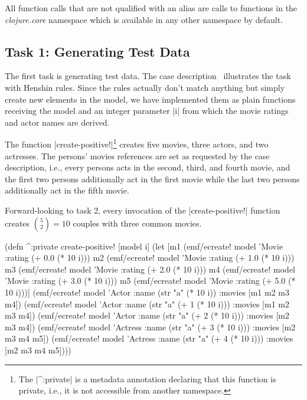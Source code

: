 \documentclass[a4paper]{article}
\newcommand{\code}{\clojureinline}
\begin{document}
All function calls that are not qualified with an alias are calls to functions
in the \emph{clojure.core} namespace which is available in any other namespace
by default.

\subsection{Task 1: Generating Test Data}
\label{sec:task-1:generating-test-data}

The first task is generating test data.  The case
description~\cite{movies-case-desc} illustrates the task with Henshin rules.
Since the rules actually don't match anything but simply create new elements in
the model, we have implemented them as plain functions receiving the model and
an integer parameter \code|i| from which the movie ratings and actor names are
derived.

The function \code|create-positive!|\footnote{The \code|^:private| is a
  metadata annotation declaring that this function is private, i.e., it is not
  accessible from another namespace.} creates five movies, three actors, and
two actresses.  The persons' \textsf{movies} references are set as requested by
the case description, i.e., every persons acts in the second, third, and fourth
movie, and the first two persons additionally act in the first movie while the
last two persons additionally act in the fifth movie.

Forward-looking to task 2, every invocation of the \code|create-positive!|
function creates \({5 \choose 2} = 10\) couples with three common movies.

\begin{clojurecode}
(defn ^:private create-positive! [model i]
  (let [m1 (emf/ecreate! model 'Movie :rating (+ 0.0 (* 10 i)))
        m2 (emf/ecreate! model 'Movie :rating (+ 1.0 (* 10 i)))
        m3 (emf/ecreate! model 'Movie :rating (+ 2.0 (* 10 i)))
        m4 (emf/ecreate! model 'Movie :rating (+ 3.0 (* 10 i)))
        m5 (emf/ecreate! model 'Movie :rating (+ 5.0 (* 10 i)))]
    (emf/ecreate! model 'Actor   :name (str "a" (* 10 i))       :movies [m1 m2 m3 m4])
    (emf/ecreate! model 'Actor   :name (str "a" (+ 1 (* 10 i))) :movies [m1 m2 m3 m4])
    (emf/ecreate! model 'Actor   :name (str "a" (+ 2 (* 10 i))) :movies [m2 m3 m4])
    (emf/ecreate! model 'Actress :name (str "a" (+ 3 (* 10 i))) :movies [m2 m3 m4 m5])
    (emf/ecreate! model 'Actress :name (str "a" (+ 4 (* 10 i))) :movies [m2 m3 m4 m5])))
\end{clojurecode}
\end{document}
